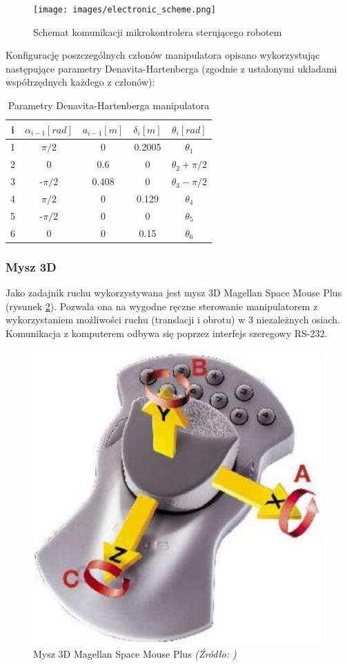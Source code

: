 \documentclass[a4paper, 12pt, twoside]{article}
\begin{document}
\begin{figure}[hbt!]
\centering
\texttt{[image: images/electronic\_scheme.png]}
\caption{Schemat komunikacji mikrokontrolera sterującego robotem}
\label{fig:electronic_scheme}
\end{figure}

Konfigurację poszczególnych członów manipulatora opisano wykorzystując następujące parametry Denavita-Hartenberga (zgodnie z ustalonymi układami współrzędnych każdego z członów):

\begin{table}[htb!]
\begin{center}
\caption{Parametry Denavita-Hartenberga manipulatora}
\begin{tabular}{ | c | c | c | c | c |}
\hline
 i & $\alpha_{i-1} [rad]$ & $a_{i-1} [m]$ & $\delta_{i} [m]$ & $\theta_{i} [rad]$ \\ 
\hline
 1 & $\pi/2$ & 0 & 0.2005 & $\theta_{1}$ \\ 
\hline
 2 & 0 & 0.6 & 0 & $\theta_{2} + \pi/2$ \\
\hline
 3 & -$\pi/2$ & 0.408 & 0 & $\theta_{3}-\pi/2$ \\
\hline
 4 & $\pi/2$ & 0 & 0.129 & $\theta_{4}$ \\ 
\hline
 5 & -$\pi/2$ & 0 & 0 & $\theta_{5}$ \\
\hline
 6 & 0 & 0 & 0.15 & $\theta_{6}$ \\
 \hline
\end{tabular}
\end{center}
\end{table}

\subsubsection{Mysz 3D}

Jako zadajnik ruchu wykorzystywana jest mysz 3D Magellan Space Mouse Plus \cite{spacemouse} (rysunek \ref{fig:mouse}). Pozwala ona na wygodne ręczne sterowanie manipulatorem z wykorzystaniem możliwości ruchu (translacji i obrotu) w 3 niezależnych osiach. Komunikacja z komputerem odbywa się poprzez interfejs szeregowy RS-232.

\begin{figure}[hbt!]
\centering
\includegraphics[width=0.4\linewidth]{images/mouse.png}
\caption{Mysz 3D Magellan Space Mouse Plus\textit{ (Źródło: \cite{spacemouse}) } }
\label{fig:mouse}
\end{figure}
\end{document}

